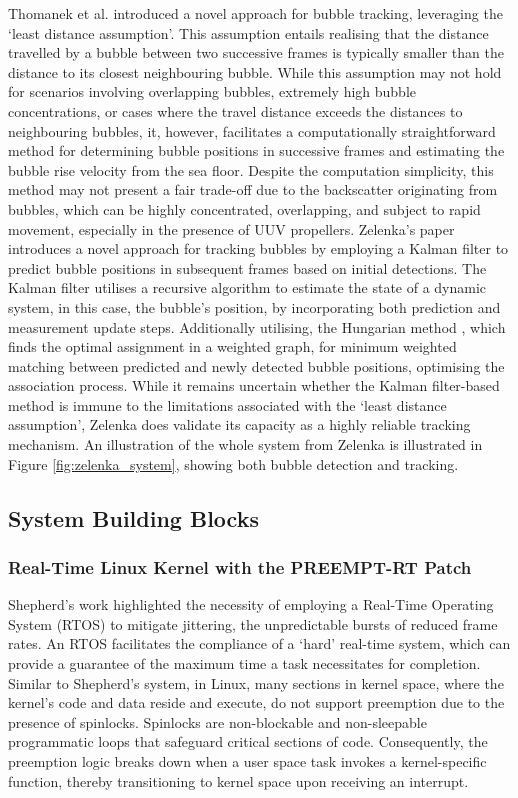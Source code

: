 Thomanek et al. introduced a novel approach for bubble tracking, leveraging the `least distance assumption'. This assumption entails realising that the distance travelled by a bubble between two successive frames is typically smaller than the distance to its closest neighbouring bubble. While this assumption may not hold for scenarios involving overlapping bubbles, extremely high bubble concentrations, or cases where the travel distance exceeds the distances to neighbouring bubbles, it, however, facilitates a computationally straightforward method for determining bubble positions in successive frames and estimating the bubble rise velocity from the sea floor. Despite the computation simplicity, this method may not present a fair trade-off due to the backscatter originating from bubbles, which can be highly concentrated, overlapping, and subject to rapid movement, especially in the presence of UUV propellers. Zelenka's paper introduces a novel approach for tracking bubbles by employing a Kalman filter \cite{kalmanNewApproachLinear1960} to predict bubble positions in subsequent frames based on initial detections. The Kalman filter utilises a recursive algorithm to estimate the state of a dynamic system, in this case, the bubble's position, by incorporating both prediction and measurement update steps. Additionally utilising, the Hungarian method \cite{kuhnHungarianMethodAssignment1955}, which finds the optimal assignment in a weighted graph, for minimum weighted matching between predicted and newly detected bubble positions, optimising the association process. While it remains uncertain whether the Kalman filter-based method is immune to the limitations associated with the `least distance assumption', Zelenka does validate its capacity as a highly reliable tracking mechanism. An illustration of the whole system from Zelenka is illustrated in Figure \ref{fig:zelenka_system}, showing both bubble detection and tracking.

\subsection{System Building Blocks}
\label{buildingblocks}

\subsubsection{Real-Time Linux Kernel with the PREEMPT-RT Patch}
\label{preempt}

Shepherd's work highlighted the necessity of employing a Real-Time Operating System (RTOS) to mitigate jittering, the unpredictable bursts of reduced frame rates. An RTOS facilitates the compliance of a `hard' real-time system, which can provide a guarantee of the maximum time a task necessitates for completion. Similar to Shepherd's system, in Linux, many sections in kernel space, where the kernel's code and data reside and execute, do not support preemption due to the presence of spinlocks. Spinlocks are non-blockable and non-sleepable programmatic loops that safeguard critical sections of code. Consequently, the preemption logic breaks down when a user space task invokes a kernel-specific function, thereby transitioning to kernel space upon receiving an interrupt. 

